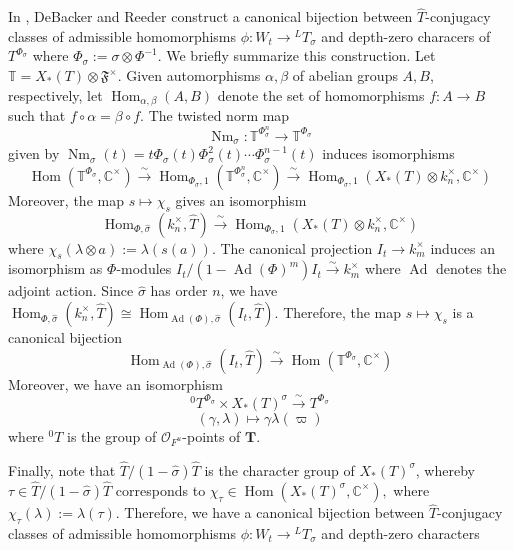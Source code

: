 \documentclass[11pt]{amsart}
\theoremstyle{plain}
\theoremstyle{definition}
\DeclareMathOperator{\Ad}{Ad}
\DeclareMathOperator{\Nm}{Nm}
\DeclareMathOperator{\Hom}{Hom}
\begin{document}
In \cite[Chapter 4]{debackerreeder}, DeBacker and Reeder construct a
canonical bijection between $\hat{T}$-conjugacy classes of admissible
homomorphisms $\phi : W_t \rightarrow {}^L T_{\sigma}$ and depth-zero
characers of $T^{\Phi_{\sigma}}$ where
$\Phi_{\sigma} := \sigma \otimes \Phi^{-1}$.  We briefly summarize
this construction. Let $\mathbb{T} = X_*(T) \otimes \mathfrak{F}^\times$.
Given automorphisms $\alpha, \beta$ of abelian groups $A,B$,
respectively, let $\Hom_{\alpha, \beta}(A,B)$ denote the set of
homomorphisms $f : A \rightarrow B$ such that $f \circ \alpha = \beta \circ f$.
The twisted norm map
$$\Nm_{\sigma} : \mathbb{T}^{\Phi_{\sigma}^n} \rightarrow \mathbb{T}^{\Phi_{\sigma}}$$
given by
$\Nm_{\sigma}(t) = t \Phi_{\sigma}(t) \Phi_{\sigma}^2(t) \cdots \Phi_{\sigma}^{n-1}(t)$
induces isomorphisms
$$\Hom(\mathbb{T}^{\Phi_{\sigma}},
  \mathbb{C}^\times) \stackrel{\sim}{\rightarrow}
  \Hom_{\Phi_{\sigma}, 1}(\mathbb{T}^{\Phi_{\sigma}^n},
  \mathbb{C}^\times) \stackrel{\sim}{\rightarrow}
  \Hom_{\Phi_{\sigma}, 1}(X_*(T) \otimes k_n^\times, \mathbb{C}^\times)$$
Moreover, the map $s \mapsto \chi_s$ gives an isomorphism
$$\Hom_{\Phi, \hat{\sigma}}(k_n^\times, \hat{T})
  \stackrel{\sim}{\rightarrow} \Hom_{\Phi_{\sigma},
  1}(X_*(T) \otimes k_n^\times, \mathbb{C}^\times)$$
where $\chi_s(\lambda \otimes a) := \lambda(s(a))$.  The canonical
projection $I_t \rightarrow k_m^\times$ induces an isomorphism
as $\Phi$-modules
$I_t / (1 - \Ad (\Phi)^m)I_t \stackrel{\sim}{\rightarrow} k_m^\times$
where $\Ad$ denotes the adjoint action.  Since $\hat{\sigma}$ has order
$n$, we have $\Hom_{\Phi, \hat{\sigma}}(k_n^\times,
\hat{T}) \cong \Hom_{\Ad(\Phi), \hat{\sigma}}(I_t, \hat{T})$.
Therefore, the map $s \mapsto \chi_s$ is a canonical bijection
$$\Hom_{\Ad(\Phi), \hat{\sigma}}(I_t, \hat{T})
  \stackrel{\sim}{\rightarrow} \Hom(\mathbb{T}^{\Phi_{\sigma}},
  \mathbb{C}^\times)$$
Moreover, we have an isomorphism
$${}^0T^{\Phi_{\sigma}} \times X_*(T)^{\sigma} \stackrel{\sim}{\rightarrow}
  T^{\Phi_{\sigma}}$$ $$(\gamma, \lambda) \mapsto \gamma \lambda(\varpi)$$
where ${}^0 T$ is the group of $\mathcal{O}_{F^u}$-points of $\mathbf{T}$.

Finally, note that $\hat{T} / (1 - \hat{\sigma}) \hat{T}$ is the
character group of $X_*(T)^{\sigma}$, whereby
$\tau \in \hat{T} / (1 - \hat{\sigma}) \hat{T}$ corresponds to
$\chi_{\tau} \in \Hom(X_*(T)^{\sigma}, \mathbb{C}^\times),$ where
$\chi_{\tau}(\lambda) := \lambda(\tau)$.  Therefore, we have a
canonical bijection between $\hat{T}$-conjugacy classes of admissible
homomorphisms $\phi : W_t \rightarrow {}^L T_{\sigma}$ and depth-zero
characters
\end{document}
